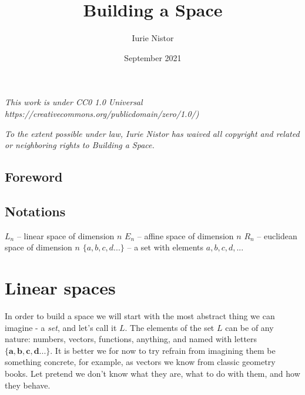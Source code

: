 \documentclass{book}
\title{Building a Space}
\author{Iurie Nistor}
\date{September 2021}
\begin{document}
\maketitle

\newpage
\emph{This work is under CC0 1.0 Universal https://creativecommons.org/publicdomain/zero/1.0/)}

\emph{To the extent possible under law, Iurie Nistor has waived all copyright and related or neighboring rights to Building a Space.}

\tableofcontents

\section{Foreword}

\section{Notations}

$L_n$ --  linear space of dimension $n$
\newline
$E_n$ --  affine space of dimension $n$
\newline
$R_n$ --  euclidean space of dimension $n$
\newline
$\{a, b, c, d...\}$ -- a set with elements $a, b, c, d, ...$

\chapter{Linear spaces}

In order to build a space we will start with the most abstract thing we can imagine - a \emph{set}, and let's call it $L$. The elements of the set $L$ can be of any nature: numbers, vectors, functions, anything, and named with letters $\{\textbf{a}, \textbf{b}, \textbf{c}, \textbf{d}...\}$. It is better we for now to try refrain from imagining them be something concrete, for example, as vectors we know from classic geometry books. Let pretend we don't know what they are, what to do with them, and how they behave.
\end{document}

